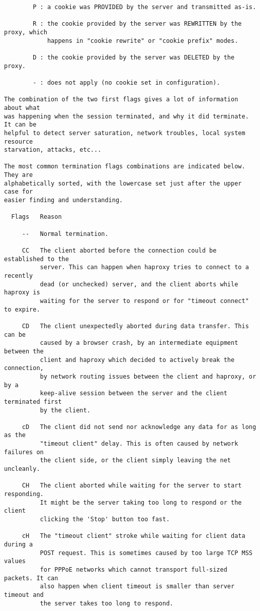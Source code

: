 \begin{verbatim}
        P : a cookie was PROVIDED by the server and transmitted as-is.

        R : the cookie provided by the server was REWRITTEN by the proxy, which
            happens in "cookie rewrite" or "cookie prefix" modes.

        D : the cookie provided by the server was DELETED by the proxy.

        - : does not apply (no cookie set in configuration).

The combination of the two first flags gives a lot of information about what
was happening when the session terminated, and why it did terminate. It can be
helpful to detect server saturation, network troubles, local system resource
starvation, attacks, etc...

The most common termination flags combinations are indicated below. They are
alphabetically sorted, with the lowercase set just after the upper case for
easier finding and understanding.

  Flags   Reason

     --   Normal termination.

     CC   The client aborted before the connection could be established to the
          server. This can happen when haproxy tries to connect to a recently
          dead (or unchecked) server, and the client aborts while haproxy is
          waiting for the server to respond or for "timeout connect" to expire.

     CD   The client unexpectedly aborted during data transfer. This can be
          caused by a browser crash, by an intermediate equipment between the
          client and haproxy which decided to actively break the connection,
          by network routing issues between the client and haproxy, or by a
          keep-alive session between the server and the client terminated first
          by the client.

     cD   The client did not send nor acknowledge any data for as long as the
          "timeout client" delay. This is often caused by network failures on
          the client side, or the client simply leaving the net uncleanly.

     CH   The client aborted while waiting for the server to start responding.
          It might be the server taking too long to respond or the client
          clicking the 'Stop' button too fast.

     cH   The "timeout client" stroke while waiting for client data during a
          POST request. This is sometimes caused by too large TCP MSS values
          for PPPoE networks which cannot transport full-sized packets. It can
          also happen when client timeout is smaller than server timeout and
          the server takes too long to respond.


\end{verbatim}
